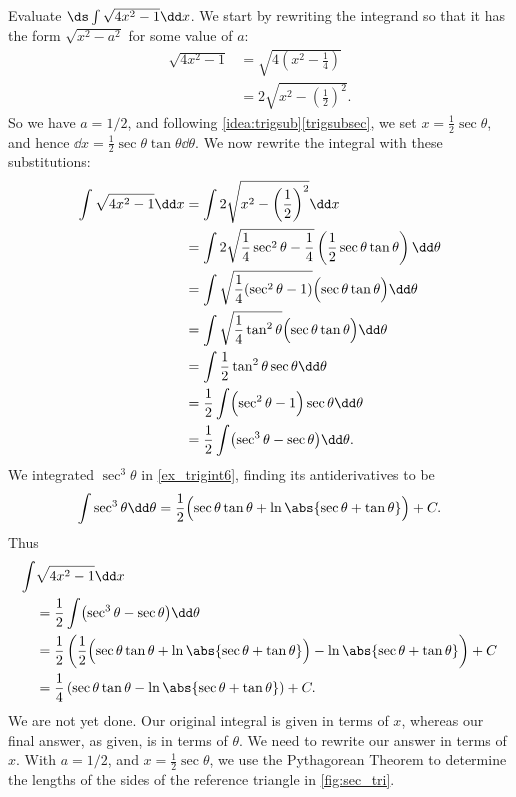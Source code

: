 \begin{example}\label{ex_trigsub2}%
Evaluate $\ds \int \sqrt{4x^2-1}\dd x$.
\solution
We start by rewriting the integrand so that it has the form $\sqrt{x^2-a^2}$ for some value of $a$:
\begin{align*}
\sqrt{4x^2-1} &= \sqrt{4\left(x^2-\frac14\right)}\\
		&= 2\sqrt{x^2-\left(\frac12\right)^2}.
\end{align*}
So we have $a=1/2$, and following \autoref{idea:trigsub}\ref*{trigsubsec}, we set $x= \frac12\sec\theta$, and hence $\dd x = \frac12\sec\theta\tan\theta\dd\theta$. %
We now rewrite the integral with these substitutions:\vspace{-.3\baselineskip}
\begin{align*}
	\int \sqrt{4x^2-1}\dd x &= \int 2\sqrt{x^2-\left(\frac12\right)^2}\dd x\\
	&= \int 2\sqrt{\frac14\sec^2\theta - \frac14}
	\left(\frac12\sec\theta\tan\theta\right)\dd\theta\\
	&=\int \sqrt{\frac14(\sec^2\theta-1)}\Bigl(\sec\theta\tan\theta\Bigr)\dd\theta\\
	&=\int\sqrt{\frac14\tan^2\theta}\Bigl(\sec\theta\tan\theta\Bigr)\dd\theta\\
	&=\int \frac12\tan^2\theta\sec\theta\dd\theta\\
	&=\frac12\int \Bigl(\sec^2\theta-1\Bigr)\sec\theta\dd\theta\\
	&=\frac12\int \bigl(\sec^3\theta - \sec\theta\bigr)\dd\theta.
\end{align*}
We integrated $\sec^3\theta$ in \autoref{ex_trigint6}, finding its antiderivatives to be
\[
\int\sec^3\theta\dd\theta
=\frac12\Bigl(\sec\theta\tan\theta+\ln\abs{\sec\theta+\tan\theta}\Bigr)+C.
\]
Thus
\begin{align*}
\int &\sqrt{4x^2-1}\dd x\\
	&=\frac12\int \bigl(\sec^3\theta-\sec\theta\bigr)\dd\theta\\
	&= \frac12\left(\frac12\Bigl(\sec\theta\tan\theta
	+\ln\abs{\sec\theta+\tan \theta}\Bigr)-\ln\abs{\sec\theta+\tan\theta}\right) + C\\
	&= \frac14\left(\sec\theta\tan\theta -\ln\abs{\sec\theta+\tan\theta}\right)+C.
\end{align*}
We are not yet done. Our original integral is given in terms of $x$, whereas our final answer, as given, is in terms of $\theta$. We need to rewrite our answer in terms of $x$. With $a=1/2$, and $x=\frac12\sec\theta$, we use the Pythagorean Theorem to determine the lengths of the sides of the reference triangle in \autoref{fig:sec_tri}.

\end{example}
